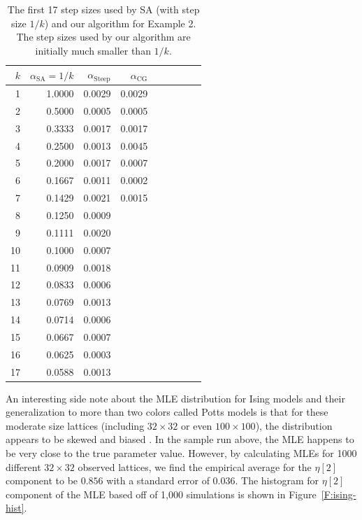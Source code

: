 \begin{table}
\caption{The first 17 step sizes used by SA (with step size $1/k$) and our algorithm 
for Example 2.  The step sizes 
used by our algorithm are initially much smaller than $1/k$.}
\begin{center}
\begin{tabular}{rrrrrrrrr}
  \hline
  $k$ & $\alpha_{\textrm{SA}} =1/k$  & $\alpha_{\textrm{Steep}}$ & $\alpha_{\textrm
{CG}}$ \\ 
  \hline
1	&	1.0000	&	0.0029	&	0.0029	\\
2	&	0.5000	&	0.0005	&	0.0005	\\
3	&	0.3333	&	0.0017	&	0.0017	\\
4	&	0.2500	&	0.0013	&	0.0045	\\
5	&	0.2000	&	0.0017	&	0.0007	\\
6	&	0.1667	&	0.0011	&	0.0002	\\
7	&	0.1429	&	0.0021	&	0.0015	\\
8	&	0.1250	&	0.0009	&		\\
9	&	0.1111	&	0.0020	&		\\
10	&	0.1000	&	0.0007	&		\\
11	&	0.0909	&	0.0018	&		\\
12	&	0.0833	&	0.0006	&		\\
13	&	0.0769	&	0.0013	&		\\
14	&	0.0714	&	0.0006	&		\\
15	&	0.0667	&	0.0007	&		\\
16	&	0.0625	&	0.0003	&		\\
17	&	0.0588	&	0.0013	&		\\
  \hline
\end{tabular}
\end{center}
\label{Table:Potts step size}
\end{table}

An interesting side note about the MLE distribution for Ising models
and their generalization to 
more than two colors called Potts models is that for these moderate size lattices (including
$32 \times 32$ or even $100 \times 100$), the distribution appears to be skewed and 
biased \citep{Composite}.  In the sample run above, the MLE happens to be very close 
to the true parameter value.  However, by calculating MLEs for 1000 different $32 \times 32$
observed lattices, we find the empirical average for the $\eta[2]$ component to be $0.856$ with a
standard error of 0.036.  The histogram for $\eta[2]$ component of the MLE 
based off of 1,000 simulations is shown in Figure~\ref{F:ising-hist}. 


